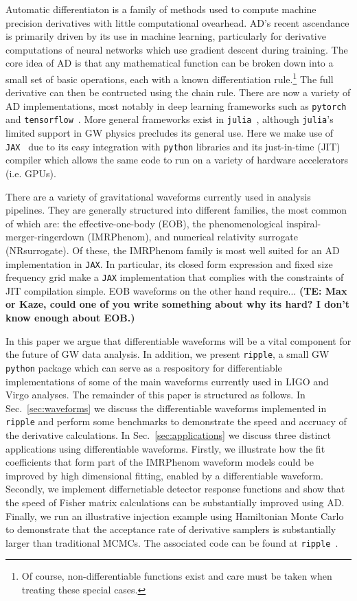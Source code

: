 \documentclass[twocolumn]{aastex631}
\newcommand{\jax}{\texttt{JAX}\xspace}
\newcommand{\ripple}{\texttt{ripple}\xspace}
\newcommand{\te}[1]{\textbf{\color{pyGreen}(TE: #1)}}
\begin{document}
Automatic differentiaton is a family of methods used to compute machine precision derivatives with little computational ovearhead. 
AD's recent ascendance is primarily driven by its use in machine learning, particularly for derivative computations of neural networks which use gradient descent during training.
The core idea of AD is that any mathematical function can be broken down into a small set of basic operations, each with a known differentiation rule.\footnote{
    Of course, non-differentiable functions exist and care must be taken when treating these special cases.
    }
The full derivative can then be contructed using the chain rule.
There are now a variety of AD implementations, most notably in deep learning frameworks such as \texttt{pytorch}~\citep{pytorch} and \texttt{tensorflow}~\citep{tensorflow2015-whitepaper}.
More general frameworks exist in \texttt{julia}~\citep{zygote, forwarddiff}, although \texttt{julia}'s limited support in GW physics precludes its general use.
Here we make use of \jax~\citep{jax2018github} due to its easy integration with \texttt{python} libraries and its just-in-time (JIT) compiler which allows the same code to run on a variety of hardware accelerators (i.e. GPUs).

There are a variety of gravitational waveforms currently used in analysis pipelines.
They are generally structured into different families, the most common of which are: the effective-one-body (EOB), the phenomenological inspiral-merger-ringerdown (IMRPhenom), and numerical relativity surrogate (NRsurrogate).
Of these, the IMRPhenom family is most well suited for an AD implementation in \jax.
In particular, its closed form expression and fixed size frequency grid make a \jax implementation that complies with the constraints of JIT compilation simple.
EOB waveforms on the other hand require... \te{Max or Kaze, could one of you write something about why its hard? I don't know enough about EOB.}

In this paper we argue that differentiable waveforms will be a vital component for the future of GW data analysis.
In addition, we present \ripple, a small GW \texttt{python} package which can serve as a respository for differentiable implementations of some of the main waveforms currently used in LIGO and Virgo analyses. 
The remainder of this paper is structured as follows. 
In Sec.~\ref{sec:waveforms} we discuss the differentiable waveforms implemented in \ripple and perform some benchmarks to demonstrate the speed and accruacy of the derivative calculations. 
In Sec.~\ref{sec:applications} we discuss three distinct applications using differentiable waveforms. 
Firstly, we illustrate how the fit coefficients that form part of the IMRPhenom waveform models could be improved by high dimensional fitting, enabled by a differentiable waveform. 
Secondly, we implement differnetiable detector response functions and show that the speed of Fisher matrix calculations can be substantially improved using AD.
Finally, we run an illustrative injection example using Hamiltonian Monte Carlo to demonstrate that the acceptance rate of derivative samplers is substantially larger than traditional MCMCs.
The associated code can be found at \ripple~\citep{ripple}.
\end{document}
